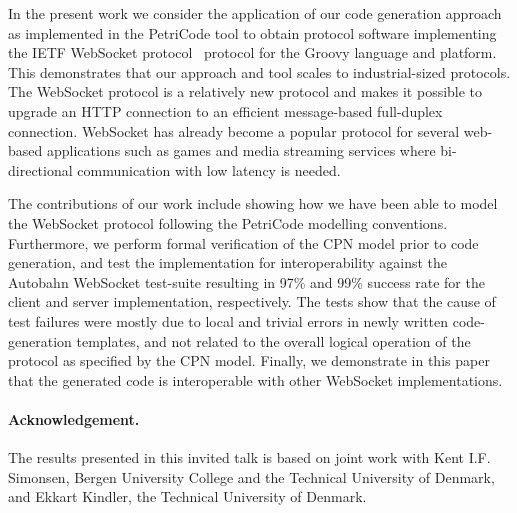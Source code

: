 \documentclass[a4paper]{llncs}
\begin{document}

In the present work we consider the application of our code generation
approach as implemented in the PetriCode tool to obtain protocol
software implementing the IETF WebSocket
protocol~\cite{fette2011websocket} protocol for the Groovy language
and platform. This demonstrates that our approach and tool scales to
industrial-sized protocols. The WebSocket protocol is a relatively new
protocol and makes it possible to upgrade an HTTP connection to an
efficient message-based full-duplex connection.  WebSocket has already
become a popular protocol for several web-based applications such as
games and media streaming services where bi-directional communication
with low latency is needed.

The contributions of our work include showing how we have been able to
model the WebSocket protocol following the PetriCode modelling
conventions. Furthermore, we perform formal verification of the CPN
model prior to code generation, and test the implementation for
interoperability against the Autobahn WebSocket test-suite
\cite{Autobahn} resulting in 97\% and 99\% success rate for the client
and server implementation, respectively. The tests show that the cause
of test failures were mostly due to local and trivial errors in newly
written code-generation templates, and not related to the overall
logical operation of the protocol as specified by the CPN
model. Finally, we demonstrate in this paper that the generated code
is interoperable with other WebSocket implementations.
  
\paragraph{Acknowledgement.} The results presented in this invited talk is based on joint work with Kent I.F. Simonsen, Bergen University College and the Technical University of Denmark, and Ekkart Kindler, the Technical
University of Denmark.



%


\end{document}
